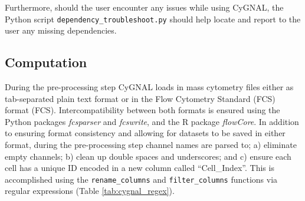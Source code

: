 Furthermore, should the user encounter any issues while using CyGNAL, the Python script \texttt{dependency\_troubleshoot.py} should help locate and report to the user any missing dependencies.

\subsection{Computation}

During the pre-processing step CyGNAL loads in mass cytometry files either as tab-separated plain text format or in the Flow Cytometry Standard (FCS) format (FCS)\cite{spidlen_data_2010}. Intercompatibility between both formats is ensured using the Python packages \emph{fcsparser}\cite{yurtsev_eyurtsevfcsparser_2020} and \emph{fcswrite}\cite{noauthor_zellmechanik-dresdenfcswrite_2021}, and the R package \emph{flowCore}\cite{ellis_flowcore_2021}. In addition to ensuring format consistency and allowing for datasets to be saved in either format, during the pre-processing step channel names are parsed to; a) eliminate empty channels; b) clean up double spaces and underscores; and c) ensure each cell has a unique ID encoded in a new column called “Cell\_Index”. This is accomplished using the \texttt{rename\_columns} and \texttt{filter\_columns} functions via regular expressions (Table \ref{tab:cygnal_regex}).

